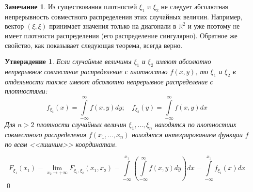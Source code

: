 \documentclass[oneside,final,14pt]{extreport}
\renewenvironment{proof}{{\bfseries Доказательство.}}{\qed}
\theoremstyle{plain}
\newtheorem*{thm*}{Утверждение}
\theoremstyle{definition}
\newtheorem*{rmrk}{Замечание}
\theoremstyle{named}
\begin{document}
\begin{rmrk}
    Из существования плотностей $\xi_1$ и $\xi_2$ не следует абсолютная непрерывность совместного распределения этих случайных величин. Например, вектор $(\xi, \xi)$ принимает значения только на диагонали в $\mathbb{R}^2$ и уже поэтому не имеет плотности распределения (его распределение сингулярно). Обратное же свойство, как показывает следующая теорема, всегда верно.
\end{rmrk}

\begin{thm*}
    Если случайные величины $\xi_1$ и $\xi_2$ имеют абсолютно непрерывное совместное распределение с плотностью $f(x, y)$, то $\xi_1$ и $\xi_2$ в отдельности также имеют абсолютно непрерывное распределение с плотностями:
    \begin{equation*}
        f_{\xi_{1}}(x)=\int\limits_{-\infty}^{\infty} f(x, y) d y ; \quad f_{\xi_{2}}(y)=\int\limits_{-\infty}^{\infty} f(x, y) d x
    \end{equation*}
    Для $n > 2$ плотности случайных величин $\xi_1, \ldots, \xi_n$ находятся по плотностиих совместного распределения $f(x_1, \ldots, x_n)$ находятся интегрированием функции $f$ по всем <<лишним>> координатам.
\end{thm*}
\begin{proof}
\begin{equation*}
    F_{\xi_{1}}\left(x_{1}\right)
    = \lim _{x_{2} \rightarrow+\infty} F_{\xi_{1}, \xi_{2}}\left(x_{1}, x_{2}\right)
    = \int\limits_{-\infty}^{x_{1}}\left(\int\limits_{-\infty}^{\infty} f(x, y) d y\right) d x
    = \int\limits_{-\infty}^{x_{1}} f_{\xi_{1}}(x) d x
\end{equation*}
\end{proof}
\end{document}
